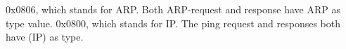 0x0806, which stands for ARP. Both ARP-request and response have ARP as type value.
0x0800, which stands for IP. The ping request and responses both have (IP) as type.



